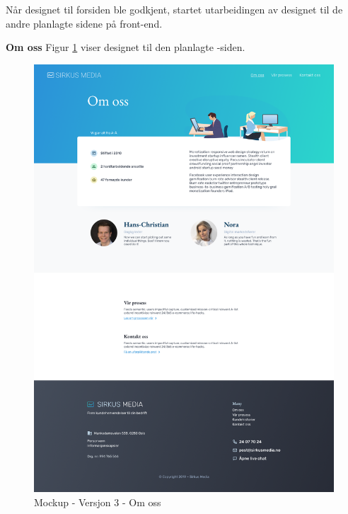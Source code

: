 Når designet til forsiden ble godkjent, startet utarbeidingen av designet til de andre planlagte sidene på front-end.

\textbf{Om oss}
Figur \ref{fig:mockup-v3-about} viser designet til den planlagte -siden.
\begin{figure}[H]
    \centering
    \includegraphics[height=.9\textheight]{design/mockup3-about.png}
    \caption{Mockup - Versjon 3 - Om oss}
    \label{fig:mockup-v3-about}
\end{figure}

